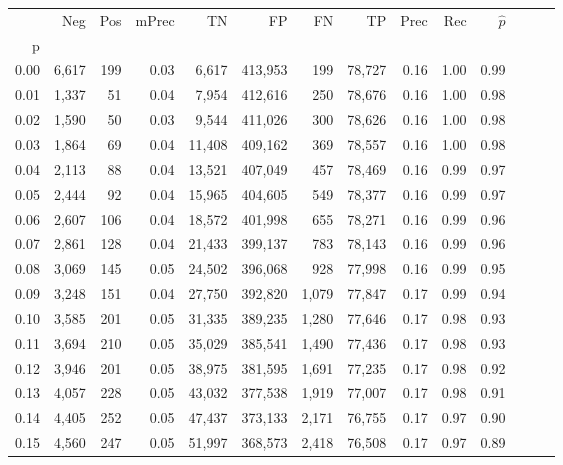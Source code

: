 \begin{tabular}{rrrrrrrrrrrrrr}
\toprule
{} &    Neg &    Pos & mPrec &       TN &       FP &      FN &      TP &  Prec &   Rec & $\hat{p}$ \\
p    &        &        &       &          &          &         &         &       &       &           \\
\midrule
0.00 &  6,617 &    199 &  0.03 &    6,617 &  413,953 &     199 &  78,727 &  0.16 &  1.00 &      0.99 \\
0.01 &  1,337 &     51 &  0.04 &    7,954 &  412,616 &     250 &  78,676 &  0.16 &  1.00 &      0.98 \\
0.02 &  1,590 &     50 &  0.03 &    9,544 &  411,026 &     300 &  78,626 &  0.16 &  1.00 &      0.98 \\
0.03 &  1,864 &     69 &  0.04 &   11,408 &  409,162 &     369 &  78,557 &  0.16 &  1.00 &      0.98 \\
0.04 &  2,113 &     88 &  0.04 &   13,521 &  407,049 &     457 &  78,469 &  0.16 &  0.99 &      0.97 \\
0.05 &  2,444 &     92 &  0.04 &   15,965 &  404,605 &     549 &  78,377 &  0.16 &  0.99 &      0.97 \\
0.06 &  2,607 &    106 &  0.04 &   18,572 &  401,998 &     655 &  78,271 &  0.16 &  0.99 &      0.96 \\
0.07 &  2,861 &    128 &  0.04 &   21,433 &  399,137 &     783 &  78,143 &  0.16 &  0.99 &      0.96 \\
0.08 &  3,069 &    145 &  0.05 &   24,502 &  396,068 &     928 &  77,998 &  0.16 &  0.99 &      0.95 \\
0.09 &  3,248 &    151 &  0.04 &   27,750 &  392,820 &   1,079 &  77,847 &  0.17 &  0.99 &      0.94 \\
0.10 &  3,585 &    201 &  0.05 &   31,335 &  389,235 &   1,280 &  77,646 &  0.17 &  0.98 &      0.93 \\
0.11 &  3,694 &    210 &  0.05 &   35,029 &  385,541 &   1,490 &  77,436 &  0.17 &  0.98 &      0.93 \\
0.12 &  3,946 &    201 &  0.05 &   38,975 &  381,595 &   1,691 &  77,235 &  0.17 &  0.98 &      0.92 \\
0.13 &  4,057 &    228 &  0.05 &   43,032 &  377,538 &   1,919 &  77,007 &  0.17 &  0.98 &      0.91 \\
0.14 &  4,405 &    252 &  0.05 &   47,437 &  373,133 &   2,171 &  76,755 &  0.17 &  0.97 &      0.90 \\
0.15 &  4,560 &    247 &  0.05 &   51,997 &  368,573 &   2,418 &  76,508 &  0.17 &  0.97 &      0.89 \\

\end{tabular}
